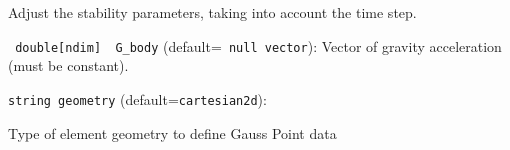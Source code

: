 Adjust the stability parameters, taking into account
the time step. 
\item\verb+ double[ndim]  G_body+ {\rm(default=\verb| null vector|)}:
 Vector of gravity acceleration (must be constant). %
\item\verb+string geometry+ {\rm(default=\verb|cartesian2d|)}:

Type of element geometry to define Gauss Point data
